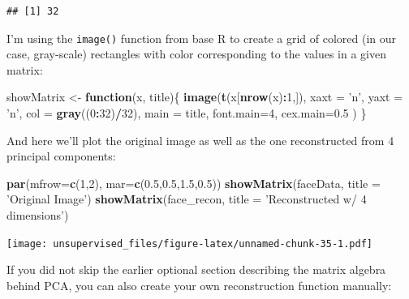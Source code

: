 \documentclass[]{article}
\newenvironment{Shaded}{\begin{snugshade}}{\end{snugshade}}
\newcommand{\ControlFlowTok}[1]{\textcolor[rgb]{0.13,0.29,0.53}{\textbf{#1}}}
\newcommand{\DataTypeTok}[1]{\textcolor[rgb]{0.13,0.29,0.53}{#1}}
\newcommand{\DecValTok}[1]{\textcolor[rgb]{0.00,0.00,0.81}{#1}}
\newcommand{\FloatTok}[1]{\textcolor[rgb]{0.00,0.00,0.81}{#1}}
\newcommand{\KeywordTok}[1]{\textcolor[rgb]{0.13,0.29,0.53}{\textbf{#1}}}
\newcommand{\NormalTok}[1]{#1}
\newcommand{\OperatorTok}[1]{\textcolor[rgb]{0.81,0.36,0.00}{\textbf{#1}}}
\newcommand{\StringTok}[1]{\textcolor[rgb]{0.31,0.60,0.02}{#1}}
\begin{document}
\begin{verbatim}
## [1] 32
\end{verbatim}

I'm using the \texttt{image()} function from base R to create a grid of
colored (in our case, gray-scale) rectangles with color corresponding to
the values in a given matrix:

\begin{Shaded}
\begin{Highlighting}[]
\NormalTok{showMatrix <-}\StringTok{ }\ControlFlowTok{function}\NormalTok{(x, title)\{}
  \KeywordTok{image}\NormalTok{(}\KeywordTok{t}\NormalTok{(x[}\KeywordTok{nrow}\NormalTok{(x)}\OperatorTok{:}\DecValTok{1}\NormalTok{,]), }
        \DataTypeTok{xaxt =} \StringTok{'n'}\NormalTok{, }\DataTypeTok{yaxt =} \StringTok{'n'}\NormalTok{, }
        \DataTypeTok{col =} \KeywordTok{gray}\NormalTok{((}\DecValTok{0}\OperatorTok{:}\DecValTok{32}\NormalTok{)}\OperatorTok{/}\DecValTok{32}\NormalTok{),}
        \DataTypeTok{main =}\NormalTok{ title, }
        \DataTypeTok{font.main=}\DecValTok{4}\NormalTok{, }
        \DataTypeTok{cex.main=}\FloatTok{0.5}
\NormalTok{        )}
\NormalTok{  \}}
\end{Highlighting}
\end{Shaded}

And here we'll plot the original image as well as the one reconstructed
from 4 principal components:

\begin{Shaded}
\begin{Highlighting}[]
\KeywordTok{par}\NormalTok{(}\DataTypeTok{mfrow=}\KeywordTok{c}\NormalTok{(}\DecValTok{1}\NormalTok{,}\DecValTok{2}\NormalTok{), }\DataTypeTok{mar=}\KeywordTok{c}\NormalTok{(}\FloatTok{0.5}\NormalTok{,}\FloatTok{0.5}\NormalTok{,}\FloatTok{1.5}\NormalTok{,}\FloatTok{0.5}\NormalTok{))}
\KeywordTok{showMatrix}\NormalTok{(faceData, }\DataTypeTok{title =} \StringTok{'Original Image'}\NormalTok{)}
\KeywordTok{showMatrix}\NormalTok{(face_recon, }\DataTypeTok{title =} \StringTok{'Reconstructed w/ 4 dimensions'}\NormalTok{)}
\end{Highlighting}
\end{Shaded}

\texttt{[image: unsupervised\_files/figure-latex/unnamed-chunk-35-1.pdf]}

If you did not skip the earlier optional section describing the matrix
algebra behind PCA, you can also create your own reconstruction function
manually:
\end{document}
